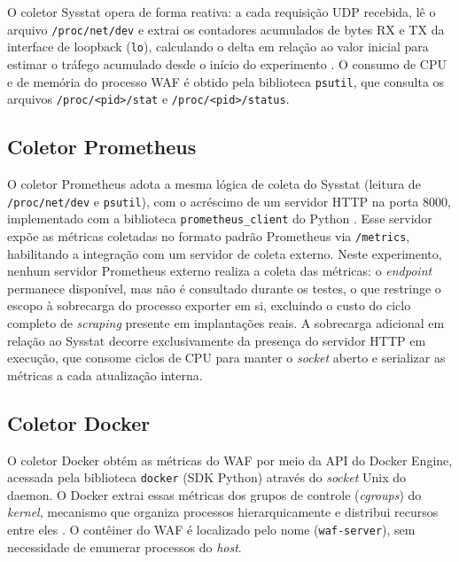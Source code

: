 O coletor Sysstat opera de forma reativa: a cada requisição UDP recebida, lê o arquivo \texttt{/proc/net/dev} e extrai os contadores acumulados de bytes RX e TX da interface de loopback (\texttt{lo}), calculando o delta em relação ao valor inicial para estimar o tráfego acumulado desde o início do experimento \cite{godard2024sysstat}. O consumo de CPU e de memória do processo WAF é obtido pela biblioteca \texttt{psutil}, que consulta os arquivos \texttt{/proc/<pid>/stat} e \texttt{/proc/<pid>/status}.

\subsection{Coletor Prometheus}

O coletor Prometheus adota a mesma lógica de coleta do Sysstat (leitura de \texttt{/proc/\linebreak[0]net/dev} e \texttt{psutil}), com o acréscimo de um servidor HTTP na porta 8000, implementado com a biblioteca \texttt{prometheus\_client} do Python \cite{turnbull_prometheus_2018}. Esse servidor expõe as métricas coletadas no formato padrão Prometheus via \texttt{/metrics}, habilitando a integração com um servidor de coleta externo. Neste experimento, nenhum servidor Prometheus externo realiza a coleta das métricas: o \textit{endpoint} permanece disponível, mas não é consultado durante os testes, o que restringe o escopo à sobrecarga do processo exporter em si, excluindo o custo do ciclo completo de \textit{scraping} presente em implantações reais. A sobrecarga adicional em relação ao Sysstat decorre exclusivamente da presença do servidor HTTP em execução, que consome ciclos de CPU para manter o \textit{socket} aberto e serializar as métricas a cada atualização interna.

\subsection{Coletor Docker}
\label{subsec:coletor_docker}

O coletor Docker obtém as métricas do WAF por meio da API do Docker Engine, acessada pela biblioteca \texttt{docker} (SDK Python) através do \textit{socket} Unix do daemon. O Docker extrai essas métricas dos grupos de controle (\textit{cgroups}) do \textit{kernel}, mecanismo que organiza processos hierarquicamente e distribui recursos entre eles \cite{kernel_cgroup_v2, docker_runmetrics}. O contêiner do WAF é localizado pelo nome (\texttt{waf-server}), sem necessidade de enumerar processos do \textit{host}.

